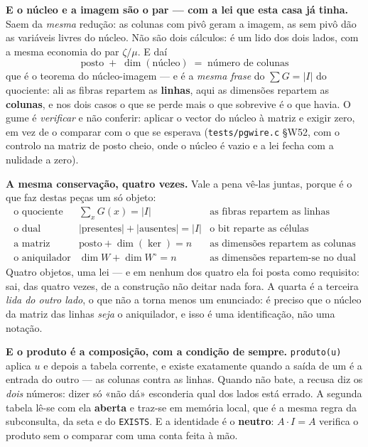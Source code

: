 \documentclass[11pt,a4paper]{article}
\newcommand{\code}[1]{\texttt{\small #1}}
\begin{document}
\medskip\noindent\textbf{E o núcleo e a imagem são o par --- com a lei que esta
casa já tinha.} Saem da \emph{mesma} redução: as colunas com pivô geram a
imagem, as sem pivô dão as variáveis livres do núcleo. Não são dois cálculos: é
um lido dos dois lados, com a mesma economia do par $\zeta/\mu$. E daí
\[
\boxed{\;\text{posto}\;+\;\dim(\text{núcleo})\;=\;\text{número de colunas}\;}
\]
que é o teorema do núcleo-imagem --- e é a \emph{mesma frase} do
$\sum G=\lvert I\rvert$ do quociente: ali as fibras repartem as \textbf{linhas},
aqui as dimensões repartem as \textbf{colunas}, e nos dois casos o que se perde
mais o que sobrevive é o que havia. O gume é \emph{verificar} e não conferir:
aplicar o vector do núcleo à matriz e exigir zero, em vez de o comparar com o
que se esperava (\code{tests/pgwire.c} §W52, com o controlo na matriz de posto
cheio, onde o núcleo é vazio e a lei fecha com a nulidade a zero).

\medskip\noindent\textbf{A mesma conservação, quatro vezes.} Vale a pena vê-las
juntas, porque é o que faz destas peças um só objeto:
\[
\begin{array}{lll}
\text{o quociente} & \sum_{x}G(x)=\lvert I\rvert & \text{as fibras repartem as linhas}\\
\text{o dual} & \lvert\text{presentes}\rvert+\lvert\text{ausentes}\rvert=\lvert I\rvert
  & \text{o bit reparte as células}\\
\text{a matriz} & \text{posto}+\dim(\ker)=n & \text{as dimensões repartem as colunas}\\
\text{o aniquilador} & \dim W+\dim W^{\circ}=n & \text{as dimensões repartem-se no dual}
\end{array}
\]
Quatro objetos, uma lei --- e em nenhum dos quatro ela foi posta como
requisito: sai, das quatro vezes, de a construção não deitar nada fora. A
quarta é a terceira \emph{lida do outro lado}, o que não a torna menos um
enunciado: é preciso que o núcleo da matriz das linhas \emph{seja} o
aniquilador, e isso é uma identificação, não uma notação.

\medskip\noindent\textbf{E o produto é a composição, com a condição de sempre.}
\code{produto(u)} aplica $u$ e depois a tabela corrente, e existe exatamente
quando a saída de um é a entrada do outro --- as colunas contra as linhas.
Quando não bate, a recusa diz os \emph{dois} números: dizer só «não dá»
esconderia qual dos lados está errado. A segunda tabela lê-se com ela
\textbf{aberta} e traz-se em memória local, que é a mesma regra da subconsulta,
da seta e do \code{EXISTS}. E a identidade é o \textbf{neutro}: $A\cdot I = A$
verifica o produto sem o comparar com uma conta feita à mão.
\end{document}
